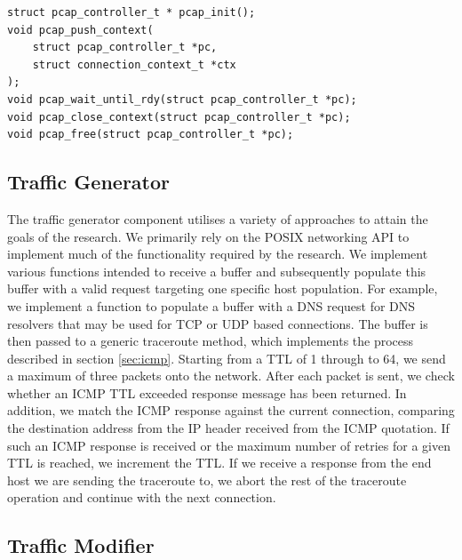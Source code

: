 \documentclass{l4proj}
\begin{document}
\begin{lstlisting}[caption={The exported API of the traffic capture component to facilitate the live capture of traffic generated by the system.}]
struct pcap_controller_t * pcap_init();
void pcap_push_context(
    struct pcap_controller_t *pc,
    struct connection_context_t *ctx
);
void pcap_wait_until_rdy(struct pcap_controller_t *pc);
void pcap_close_context(struct pcap_controller_t *pc);
void pcap_free(struct pcap_controller_t *pc);

\end{lstlisting}

\subsection{Traffic Generator}
\label{sec:impltg}

The traffic generator component utilises a variety of approaches to attain the goals of the research. We primarily rely on the POSIX networking API to implement much of the functionality required by the research. We implement various functions intended to receive a buffer and subsequently populate this buffer with a valid request targeting one specific host population. For example, we implement a function to populate a buffer with a DNS request for DNS resolvers that may be used for TCP or UDP based connections. The buffer is then passed to a generic traceroute method, which implements the process described in section \ref{sec:icmp}. Starting from a TTL of 1 through to 64, we send a maximum of three packets onto the network. After each packet is sent, we check whether an ICMP TTL exceeded response message has been returned. In addition, we match the ICMP response against the current connection, comparing the destination address from the IP header received from the ICMP quotation. If such an ICMP response is received or the maximum number of retries for a given TTL is reached, we increment the TTL. If we receive a response from the end host we are sending the traceroute to, we abort the rest of the traceroute operation and continue with the next connection.

\subsection{Traffic Modifier}

\end{document}
